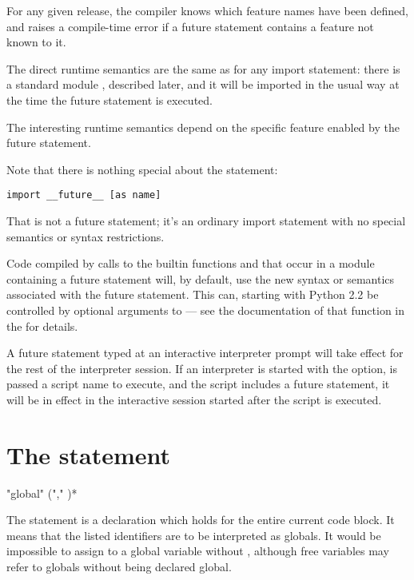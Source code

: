 For any given release, the compiler knows which feature names have been
defined, and raises a compile-time error if a future statement contains
a feature not known to it.

The direct runtime semantics are the same as for any import statement:
there is a standard module , described later, and
it will be imported in the usual way at the time the future statement
is executed.

The interesting runtime semantics depend on the specific feature
enabled by the future statement.

Note that there is nothing special about the statement:

\begin{verbatim}
import __future__ [as name]
\end{verbatim}

That is not a future statement; it's an ordinary import statement with
no special semantics or syntax restrictions.

Code compiled by calls to the builtin functions  and
 that occur in a module
 containing a future statement will, by default, use the new 
syntax or semantics associated with the future statement.  This can,
starting with Python 2.2 be controlled by optional arguments to
 --- see the documentation of that function in the
 for
details.

A future statement typed at an interactive interpreter prompt will
take effect for the rest of the interpreter session.  If an
interpreter is started with the  option, is passed a
script name to execute, and the script includes a future statement, it
will be in effect in the interactive session started after the script
is executed.

\section{The  statement \label{global}}

\begin{productionlist}
             {"global"  ("," )*}
\end{productionlist}

The  statement is a declaration which holds for the
entire current code block.  It means that the listed identifiers are to be
interpreted as globals.  It would be impossible to assign to a global
variable without , although free variables may refer
to globals without being declared global.

